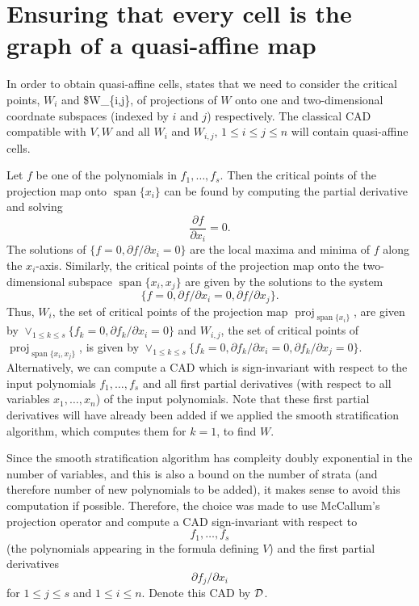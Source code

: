 \documentclass[
]{book}
\theoremstyle{definition}
\theoremstyle{definition}
\theoremstyle{definition}
\theoremstyle{definition}
\theoremstyle{remark}
\begin{document}
\hypertarget{ensuring-that-every-cell-is-the-graph-of-a-quasi-affine-map}{%
\section{Ensuring that every cell is the graph of a quasi-affine map}\label{ensuring-that-every-cell-is-the-graph-of-a-quasi-affine-map}}

In order to obtain quasi-affine cells, \citep[Lemma 3.19]{bgv15} states that we need to consider the critical points, \(W_{i}\) and \$W\_\{i,j\}, of projections of \(W\) onto one and two-dimensional coordnate subspaces (indexed by \(i\) and \(j\)) respectively. The classical CAD compatible with \(V, W\) and all \(W_i\) and \(W_{i,j}\), \(1 \le i \le j \le n\) will contain quasi-affine cells.

Let \(f\) be one of the polynomials in \(f_1,\ldots,f_s\). Then the critical points of the projection map onto \({\operatorname{span} \{x_i\}}\) can be found by computing the partial derivative and solving
\[
\dfrac{\partial f}{\partial x_i} = 0.
\]
The solutions of \(\{ f = 0, \partial f / \partial x_i = 0 \}\) are the local maxima and minima of \(f\) along the \(x_i\)-axis. Similarly, the critical points of the projection map onto the two-dimensional subspace \({\operatorname{span} \{x_i,x_j\}}\) are given by the solutions to the system
\[
\{ f = 0, \partial f / \partial x_i = 0, \partial f / \partial x_j \}.
\]
Thus, \(W_i\), the set of critical points of the projection map \({\operatorname{proj}_{{\operatorname{span} \{x_i\}}}}\), are given by \(\lor_{1 \le k \le s} \{ f_k = 0, \partial f_k / \partial x_i = 0 \}\) and \(W_{i,j}\), the set of critical points of \({\operatorname{proj}_{{\operatorname{span} \{x_i,x_j\}}}}\), is given by \(\lor_{1 \le k \le s} \{ f_k = 0, \partial f_k / \partial x_i = 0, \partial f_k / \partial x_j = 0 \}\).
Alternatively, we can compute a CAD which is sign-invariant with respect to the input polynomials \(f_1,\ldots,f_s\) and all first partial derivatives (with respect to all variables \(x_1,\ldots,x_n\)) of the input polynomials.
Note that these first partial derivatives will have already been added if we applied the smooth stratification algorithm, which computes them for \(k=1\), to find \(W\).

Since the smooth stratification algorithm has compleity doubly exponential in the number of variables, and this is also a bound on the number of strata (and therefore number of new polynomials to be added), it makes sense to avoid this computation if possible. Therefore, the choice was made to use McCallum's projection operator and compute a CAD sign-invariant with respect to \[f_1,\ldots,f_s\] (the polynomials appearing in the formula defining \(V\)) and the first partial derivatives
\[
\partial f_j / \partial x_i
\]
for \(1 \le j \le s\) and \(1 \le i \le n\).
Denote this CAD by \(\cal D\).
\end{document}
